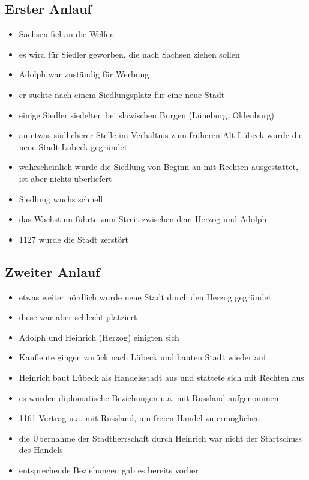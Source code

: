 \documentclass[10pt,a4paper,oneside,ngerman,numbers=noenddot]{scrartcl}
\newenvironment{myitemize}{\begin{itemize}\itemsep -8pt}{\end{itemize}} %
\begin{document}
\subsection*{Erster Anlauf}
\begin{myitemize}
    \item Sachsen fiel an die Welfen
    \item es wird für Siedler geworben, die nach Sachsen ziehen sollen
    \item Adolph war zuständig für Werbung
    \item er suchte nach einem Siedlungsplatz für eine neue Stadt
    \item einige Siedler siedelten bei slawischen Burgen (Lüneburg, Oldenburg)
    \item an etwas südlicherer Stelle im Verhältnis zum früheren Alt-Lübeck wurde die neue Stadt Lübeck gegründet
    \item wahrscheinlich wurde die Siedlung von Beginn an mit Rechten ausgestattet, ist aber nichts überliefert
    \item Siedlung wuchs schnell
    \item das Wachstum führte zum Streit zwischen dem Herzog und Adolph
    \item 1127 wurde die Stadt zerstört
\end{myitemize}

\subsection*{Zweiter Anlauf}
\begin{myitemize}
    \item etwas weiter nördlich wurde neue Stadt durch den Herzog gegründet
    \item diese war aber schlecht platziert
    \item Adolph und Heinrich (Herzog) einigten sich
    \item Kaufleute gingen zurück nach Lübeck und bauten Stadt wieder auf
    \item Heinrich baut Lübeck als Handelsstadt aus und stattete sich mit Rechten aus
    \item es wurden diplomatische Beziehungen u.a. mit Russland aufgenommen
    \item 1161 Vertrag u.a. mit Russland, um freien Handel zu ermöglichen
    \item die Übernahme der Stadtherrschaft durch Heinrich war nicht der Startschuss des Handels
    \item entsprechende Beziehungen gab es bereits vorher
\end{myitemize}
\end{document}
